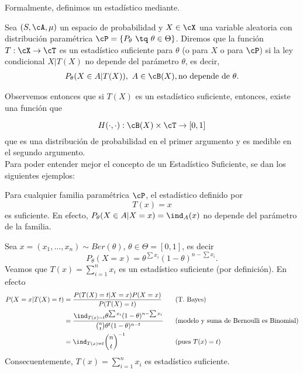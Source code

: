 Formalmente, definimos un estadístico mediante. 
\begin{definition}
\label{def:estadístico_suficiente}
Sea $(S,\cA,\mu)$ un espacio de probabilidad y $X\in\cX$ una variable aleatoria con distribución paramétrica $\cP = \{P_\theta\ \tq\ \theta\in\Theta\}$. Diremos que la función $T:\cX\rightarrow\cT$ es un estadístico suficiente para $\theta$ (o para $X$ o para $\cP$) si la ley condicional $X|T(X)$ no depende del parámetro $\theta$, es decir, 
\begin{align}
\nonumber
	P_\theta(X\in A | T(X)),\ A\in\cB(X), \text{no depende de }\theta.
\end{align} 
\end{definition}

Observemos entonces que si $T(X)$ es un estadístico suficiente, entonces, existe una función que

\begin{equation}
\nonumber
	H(\cdot,\cdot): \cB(X)\times\cT \rightarrow [0,1]
\end{equation}
que es una distribución de probabilidad en el primer argumento y es medible en el segundo argumento.\\

Para poder entender mejor el concepto de un Estadístico Suficiente, se dan los siguientes ejemplos:

\begin{example}
	\label{ex:suficiencia_trivial}
	Para cualquier familia paramétrica $\cP$, el estadístico definido por
	\begin{equation}
	\nonumber
		T(x) = x
	\end{equation}
es suficiente. En efecto, $P_\theta(X\in A|X=x) = \ind_{A}(x)$ no depende del parámetro de la familia. 
\end{example}

\begin{example}
	Sea $x=(x_1,\ldots,x_n) \sim Ber(\theta)$, $\theta \in \Theta = [0,1]$, es decir
	\begin{equation}
	\nonumber
		P_\theta(X=x) = \theta^{\sum x_i}(1-\theta)^{n-\sum x_i}.
	\end{equation}
	Veamos que $T(x) = \sum\limits_{i=1}^{n} x_i$ es un estadístico suficiente (por definición). En efecto
	\begin{alignat*}{3}
		P(X=x|T(X)=t) 	&= \frac{P(T(X)=t| X=x )P( X=x )}{P(T(X)=t)} \quad&&\text{(T. Bayes)}\\
						&= \frac{\ind_{T(x)=t}\theta^{\sum x_i}(1-\theta)^{n-\sum x_i}}{\binom{n}{t}\theta^t(1-\theta)^{n-t}} &&\text{(modelo y suma de Bernoulli es Binomial)}\\
						&= \ind_{T(x)=t} \binom{n}{t}^{-1} && \text{(pues $T(x)=t$)}
	\end{alignat*}
	Consecuentemente, $T(x)=\sum\limits_{i=1}^{n} x_i$ es estadístico suficiente.
\end{example}

